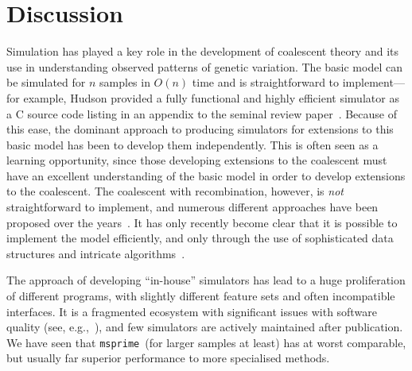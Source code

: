 \documentclass{article}
\newcommand{\msprime}[0]{\texttt{msprime}}
\begin{document}
\section*{Discussion}
Simulation has played a key role in the development of coalescent theory
and its use in understanding observed patterns of genetic variation.
The basic model can be simulated for $n$ samples in $O(n)$ time
and is straightforward to implement---for example, Hudson provided a fully
functional and highly efficient simulator as a C source code listing in an
appendix to the seminal review paper~\citep{hudson1990gene}. Because of
this ease, the dominant approach to producing simulators for extensions
to this basic model has been to develop them independently. This is
often seen as a learning opportunity, since those developing extensions
to the coalescent must have an excellent understanding of the basic
model in order to develop extensions to the coalescent.
The coalescent with recombination, however, is \emph{not} straightforward
to implement, and numerous different approaches have been
proposed over the
years~\citep{hudson1983properties,griffiths1997ancestral,wiuf1999recombination,
mcvean2005approximating}. It has only recently become clear that it is
possible to implement the model efficiently, and only through the use
of sophisticated data structures and
intricate algorithms~\citep{kelleher2016efficient}.

The approach of developing ``in-house'' simulators
has lead to a huge proliferation of different programs, with
slightly different feature sets and often incompatible interfaces.
It is a fragmented ecosystem with significant issues with software
quality (see, e.g.,~\cite{yang2014critical}),
and few simulators are actively maintained after publication.
We have seen that \msprime\ (for larger samples at least)
has at worst comparable, but usually far superior
performance to more specialised methods.

\end{document}
